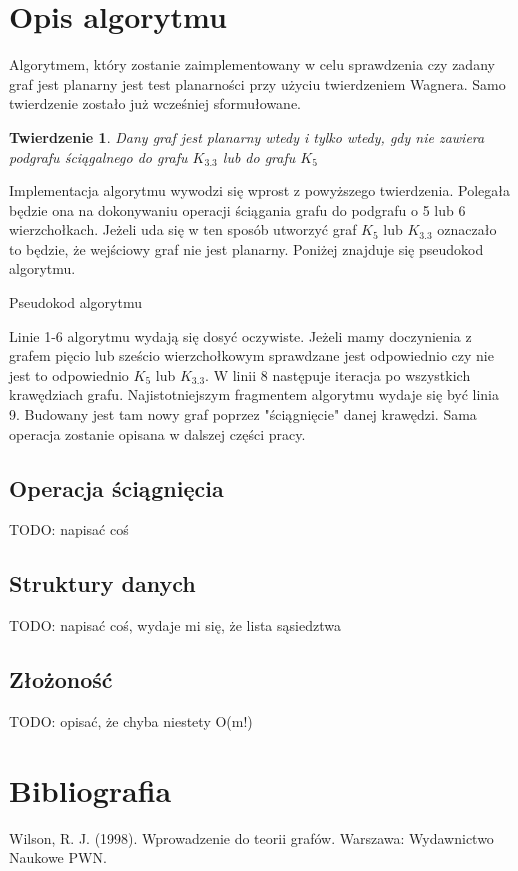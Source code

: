 \documentclass[a4 122pt]{article}
\newtheorem{twierdzenie}{Twierdzenie}
\begin{document}
	\section{Opis algorytmu}	
	Algorytmem, który zostanie zaimplementowany w celu sprawdzenia czy zadany graf jest planarny jest test planarności przy użyciu twierdzeniem Wagnera. 
	Samo twierdzenie zostało już wcześniej sformułowane. 
	\begin{twierdzenie}
	Dany graf jest planarny wtedy i tylko wtedy, gdy nie zawiera podgrafu ściągalnego do grafu $K_{3.3}$ lub do grafu $ K_5 $
	\end{twierdzenie}
	Implementacja algorytmu wywodzi się wprost z powyższego twierdzenia. 
	Polegała będzie ona na dokonywaniu operacji ściągania grafu do podgrafu o 5 lub 6 wierzchołkach.
	Jeżeli uda się w ten sposób utworzyć graf $ K_5 $ lub $K_{3.3}$ oznaczało to będzie, że wejściowy graf nie jest planarny.
	Poniżej znajduje się pseudokod algorytmu.
	
	
	\begin{algorithm}[H]
	\DontPrintSemicolon
	\LinesNumbered
	\newcommand{\forcond}{$i=0$ \KwTo $n$}
	\caption{Pseudokod algorytmu}
	\end{algorithm}
	
	Linie 1-6 algorytmu wydają się dosyć oczywiste. Jeżeli mamy doczynienia z grafem pięcio lub sześcio wierzchołkowym sprawdzane 
	jest odpowiednio czy nie jest to odpowiednio $K_5$ lub $K_3.3$. W linii 8 następuje iteracja po wszystkich krawędziach grafu. 
	Najistotniejszym fragmentem algorytmu wydaje się być linia 9. Budowany jest tam nowy graf poprzez "ściągnięcie" danej krawędzi. 
	Sama operacja zostanie opisana w dalszej części pracy.
	
	\subsection{Operacja ściągnięcia}
	TODO: napisać coś
	
	\subsection{Struktury danych}
	TODO: napisać coś, wydaje mi się, że lista sąsiedztwa
	
	\subsection{Złożoność}
	
	TODO: opisać, że chyba niestety O(m!)
	
	\section{Bibliografia}

		Wilson, R. J. (1998). Wprowadzenie do teorii grafów. Warszawa: Wydawnictwo Naukowe PWN.
\end{document}
